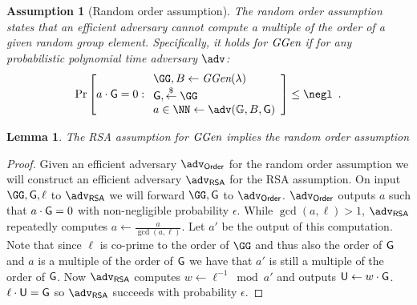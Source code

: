 \documentclass[12pt]{article}
\theoremstyle{Definition}
\newtheorem{lemma}{Lemma}
\newtheorem{assumption}{Assumption}
\begin{document}
\begin{assumption}[Random order assumption]
	The random order assumption states that an efficient adversary cannot compute a multiple of the order of a given random group element. Specifically, it holds for $\textit{GGen}$ if for any probabilistic polynomial time adversary $\adv$:
	\[
    \Pr\left[a\cdot \Generator =0:
    \begin{array}{l}
         \GG,B \leftarrow \ggen(\lambda)  \\
         \Generator, \sample \GG\\
         a \in \NN \leftarrow \adv(\mathbb{G},B, \Generator) \\
    \end{array}\right] \leq \negl \enspace .
    \]
\end{assumption}
\begin{lemma}
\label{lem:roa-to-rsa}
	The RSA assumption for $\textit{GGen}$ implies the random order assumption
	\end{lemma}
\begin{proof}
	Given an efficient adversary $\adv_{\textsf{Order}}$ for the random order assumption we will construct an efficient adversary $\adv_{\textsf{RSA}}$ for the RSA assumption. On input $\GG,\Generator,\ell$ to $\adv_{\textsf{RSA}}$ we will forward $\GG,\Generator$ to $\adv_{\textsf{Order}}$. $\adv_{\textsf{Order}}$ outputs $a$ such that $a\cdot \mathsf{G}=0$ with non-negligible probability $\epsilon$. 
	While $\gcd(a,\ell)>1$, $\adv_{\textsf{RSA}}$ repeatedly computes $a\gets \frac{a}{\gcd(a,\ell)}$. Let $a'$ be the output of this computation. Note that since $\ell$ is co-prime to the order of $\GG$ and thus also the order of $\mathsf{G}$ and $a$ is a multiple of the order of $\mathsf{G}$ we have that $a'$ is still a multiple of the order of $\mathsf{G}$. Now $\adv_{\textsf{RSA}}$ computes $w\gets \ell^{-1} \bmod a'$ and outputs $\mathsf{U} \gets w\cdot \mathsf{G}$. $\ell \cdot \mathsf{U}=\mathsf{G}$ so $\adv_{\textsf{RSA}}$ succeeds with probability $\epsilon$.
\end{proof}
\end{document}
